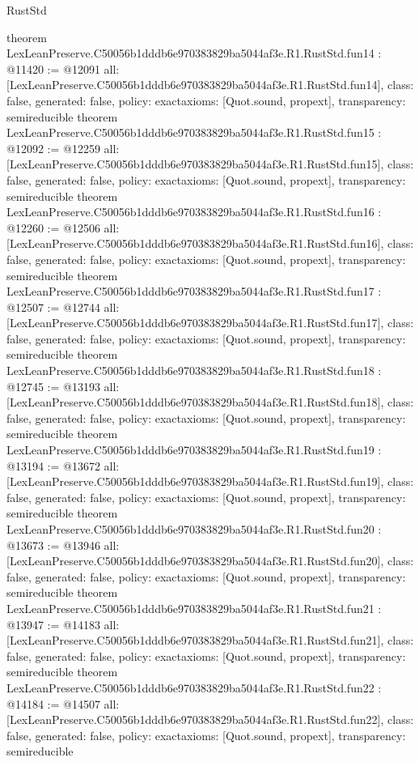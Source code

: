 \begin{lexlean}{RustStd}
\begin{coremodule}
{}
theorem LexLeanPreserve.C50056b1dddb6e970383829ba5044af3e.R1.RustStd.fun14 : @11420 := @12091 {
  all: [LexLeanPreserve.C50056b1dddb6e970383829ba5044af3e.R1.RustStd.fun14],
  class: false,
  generated: false,
  policy: exact{axioms: [Quot.sound, propext]},
  transparency: semireducible
}
theorem LexLeanPreserve.C50056b1dddb6e970383829ba5044af3e.R1.RustStd.fun15 : @12092 := @12259 {
  all: [LexLeanPreserve.C50056b1dddb6e970383829ba5044af3e.R1.RustStd.fun15],
  class: false,
  generated: false,
  policy: exact{axioms: [Quot.sound, propext]},
  transparency: semireducible
}
theorem LexLeanPreserve.C50056b1dddb6e970383829ba5044af3e.R1.RustStd.fun16 : @12260 := @12506 {
  all: [LexLeanPreserve.C50056b1dddb6e970383829ba5044af3e.R1.RustStd.fun16],
  class: false,
  generated: false,
  policy: exact{axioms: [Quot.sound, propext]},
  transparency: semireducible
}
theorem LexLeanPreserve.C50056b1dddb6e970383829ba5044af3e.R1.RustStd.fun17 : @12507 := @12744 {
  all: [LexLeanPreserve.C50056b1dddb6e970383829ba5044af3e.R1.RustStd.fun17],
  class: false,
  generated: false,
  policy: exact{axioms: [Quot.sound, propext]},
  transparency: semireducible
}
theorem LexLeanPreserve.C50056b1dddb6e970383829ba5044af3e.R1.RustStd.fun18 : @12745 := @13193 {
  all: [LexLeanPreserve.C50056b1dddb6e970383829ba5044af3e.R1.RustStd.fun18],
  class: false,
  generated: false,
  policy: exact{axioms: [Quot.sound, propext]},
  transparency: semireducible
}
theorem LexLeanPreserve.C50056b1dddb6e970383829ba5044af3e.R1.RustStd.fun19 : @13194 := @13672 {
  all: [LexLeanPreserve.C50056b1dddb6e970383829ba5044af3e.R1.RustStd.fun19],
  class: false,
  generated: false,
  policy: exact{axioms: [Quot.sound, propext]},
  transparency: semireducible
}
theorem LexLeanPreserve.C50056b1dddb6e970383829ba5044af3e.R1.RustStd.fun20 : @13673 := @13946 {
  all: [LexLeanPreserve.C50056b1dddb6e970383829ba5044af3e.R1.RustStd.fun20],
  class: false,
  generated: false,
  policy: exact{axioms: [Quot.sound, propext]},
  transparency: semireducible
}
theorem LexLeanPreserve.C50056b1dddb6e970383829ba5044af3e.R1.RustStd.fun21 : @13947 := @14183 {
  all: [LexLeanPreserve.C50056b1dddb6e970383829ba5044af3e.R1.RustStd.fun21],
  class: false,
  generated: false,
  policy: exact{axioms: [Quot.sound, propext]},
  transparency: semireducible
}
theorem LexLeanPreserve.C50056b1dddb6e970383829ba5044af3e.R1.RustStd.fun22 : @14184 := @14507 {
  all: [LexLeanPreserve.C50056b1dddb6e970383829ba5044af3e.R1.RustStd.fun22],
  class: false,
  generated: false,
  policy: exact{axioms: [Quot.sound, propext]},
  transparency: semireducible
}
\end{coremodule}
\end{lexlean}
